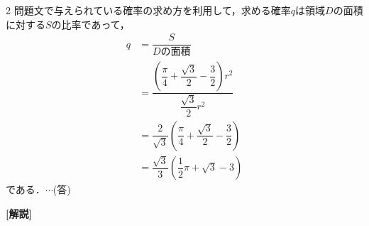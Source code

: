 \documentclass[../../main.tex]{subfiles}
\begin{document}
\begin{multicols}{2}
  問題文で与えられている確率の求め方を利用して，求める確率$q$は領域$D$の面積に対する$S$の比率であって，
  \begin{align}
    q
    & = \dfrac{S}{D\text{の面積}}                                                                          \\
    & = \dfrac{\left(\dfrac{\pi}{4} + \dfrac{\sqrt{3}}{2} - \dfrac{3}{2}\right)r^2}{\dfrac{\sqrt{3}}{2}r^2} \\
    & = \dfrac{2}{\sqrt{3}} \left(\dfrac{\pi}{4} + \dfrac{\sqrt{3}}{2} - \dfrac{3}{2}\right)               \\
    & = \dfrac{\sqrt{3}}{3}\left(\dfrac{1}{2}\pi + \sqrt{3} - 3\right)
  \end{align}
  である．$\cdots$(答)

  {\bf [解説]}

  \newpage
\end{multicols}
\end{document}
